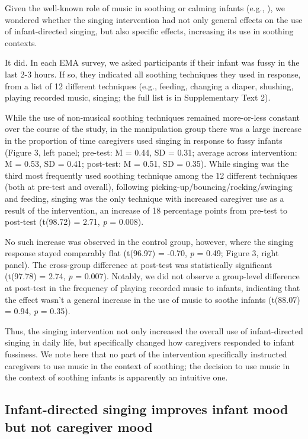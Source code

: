 \documentclass[
]{article}
\begin{document}
Given the well-known role of music in soothing or calming infants (e.g.,
), we
wondered whether the singing intervention had not only general effects
on the use of infant-directed singing, but also specific effects,
increasing its use in soothing contexts.

It did. In each EMA survey, we asked participants if their infant was
fussy in the last 2-3 hours. If so, they indicated all soothing
techniques they used in response, from a list of 12 different techniques
(e.g., feeding, changing a diaper, shushing, playing recorded music,
singing; the full list is in Supplementary Text 2).

While the use of non-musical soothing techniques remained more-or-less
constant over the course of the study, in the manipulation group there
was a large increase in the proportion of time caregivers used singing
in response to fussy infants (Figure 3, left panel; pre-test: M = 0.44,
SD = 0.31; average across intervention: M = 0.53, SD = 0.41; post-test:
M = 0.51, SD = 0.35). While singing was the third most frequently used
soothing technique among the 12 different techniques (both at pre-test
and overall), following picking-up/bouncing/rocking/swinging and
feeding, singing was the only technique with increased caregiver use as
a result of the intervention, an increase of 18 percentage points from
pre-test to post-test (t(98.72) = 2.71, \emph{p} = 0.008).

No such increase was observed in the control group, however, where the
singing response stayed comparably flat (t(96.97) = -0.70, \emph{p} =
0.49; Figure 3, right panel). The cross-group difference at post-test
was statistically significant (t(97.78) = 2.74, \emph{p} = 0.007).
Notably, we did not observe a group-level difference at post-test in the
frequency of playing recorded music to infants, indicating that the
effect wasn't a general increase in the use of music to soothe infants
(t(88.07) = 0.94, \emph{p} = 0.35).

Thus, the singing intervention not only increased the overall use of
infant-directed singing in daily life, but specifically changed how
caregivers responded to infant fussiness. We note here that no part of
the intervention specifically instructed caregivers to use music in the
context of soothing; the decision to use music in the context of
soothing infants is apparently an intuitive one.

\subsection{Infant-directed singing improves infant mood but not
caregiver
mood}\label{infant-directed-singing-improves-infant-mood-but-not-caregiver-mood}
\end{document}
